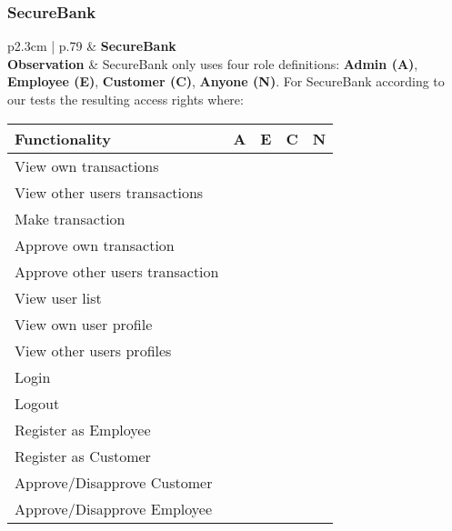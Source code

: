 \subsubsection{SecureBank}
\begin{longtable}[l]{p{2.3cm} | p{.79\linewidth}}
    \hline
    & \textbf{SecureBank} \\ 
    \hline
    \textbf{Observation} &
    	SecureBank only uses four role definitions: \textbf{Admin (A)}, \textbf{Employee (E)}, \textbf{Customer (C)}, \textbf{Anyone (N)}.
		For SecureBank according to our tests the resulting access rights where:
		\begin{center}
		    \begin{tabular}{ | l | l | l | l | l |}
		    \hline
		    \textbf{Functionality} 			& \textbf{A} & \textbf{E} & \textbf{C} & \textbf{N} \\ \hline
		    View own transactions 			& \xmark  	& \xmark  	& \cmark 	& \xmark \\ \hline
		    View other users transactions 	& \cmark  	& \cmark 	& \xmark	& \xmark \\ \hline
		    Make transaction 				& \xmark  	& \xmark 	& \cmark 	& \xmark \\ \hline
		    Approve own transaction 		& \xmark  	& \xmark 	& \xmark 	& \xmark \\ \hline
		    Approve other users transaction & \cmark  	& \cmark 	& \xmark 	& \xmark \\ \hline
		    View user list 					& \cmark  	& \cmark 	& \xmark 	& \xmark \\ \hline
		    View own user profile 			& \cmark  	& \cmark 	& \cmark 	& \xmark \\ \hline
		    View other users profiles 		& \cmark  	& \cmark 	& \xmark 	& \xmark \\ \hline
		    Login 							& \cmark  	& \cmark 	& \cmark 	& \xmark \\ \hline
		    Logout 							& \cmark  	& \cmark 	& \cmark 	& \xmark \\ \hline
		    Register as Employee 			& \xmark  	& \xmark 	& \xmark 	& \cmark \\ \hline
		    Register as Customer 			& \xmark  	& \xmark 	& \xmark 	& \cmark \\ \hline
		    Approve/Disapprove Customer 	& \cmark  	& \cmark 	& \xmark 	& \xmark \\ \hline
		    Approve/Disapprove Employee 	& \cmark  	& \xmark 	& \xmark 	& \xmark \\ \hline
		    \end{tabular}

\end{center}
\end{longtable}
